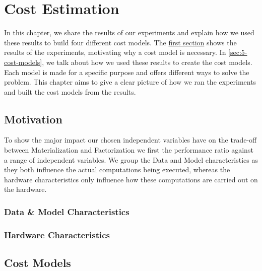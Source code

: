 
\chapter{Cost Estimation}

\label{chapter:cost-estimation}
In this chapter, we share the results of our experiments and explain how we used these results to build four different cost models. The \hyperref[sec:5-motivation]{first section} shows the results of the experiments, motivating why a cost model is necessary. In \autoref{sec:5-cost-models}, we talk about how we used these results to create the cost models. Each model is made for a specific purpose and offers different ways to solve the problem. This chapter aims to give a clear picture of how we ran the experiments and built the cost models from the results.

\section{Motivation}
\label{sec:5-motivation}
To show the major impact our chosen independent variables have on the trade-off between Materialization and Factorization we first the performance ratio against a range of independent variables. We group the Data and Model characteristics as they both influence the actual computations being executed, whereas the hardware characteristics only influence how these computations are carried out on the hardware.

\subsection{Data \& Model Characteristics}


\subsection{Hardware Characteristics}



\section{Cost Models}
\label{sec:5-cost-models}


